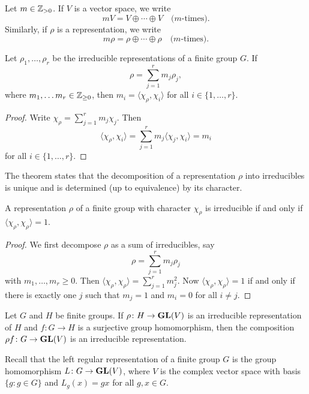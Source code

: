Let $m\in\mathbb{Z}_{>0}$. If $V$ is a vector space, we 
write \[
mV=V\oplus\cdots\oplus V\quad\text{($m$-times)}.
\]
Similarly,
if $\rho$ is a representation, 
we write 
\[
m\rho=\rho\oplus\cdots\oplus\rho\quad\text{($m$-times)}.
\]

\begin{theorem}
    Let $\rho_1,\dots,\rho_r$ be the irreducible representations of a finite group $G$. If 
	\[ 
    \rho=\sum_{j=1}^rm_j\rho_j,
    \]
    where $m_1,\dots m_r\in\mathbb{Z}_{\geq0}$, then
    $m_i=\langle \chi_\rho,\chi_i\rangle$ for all $i\in\{1,\dots,r\}$. 
\end{theorem}

\begin{proof}
    Write $\chi_\rho=\sum_{j=1}^rm_j\chi_j$. Then
    \[
    \langle\chi_\rho,\chi_i\rangle=\sum_{j=1}^rm_j\langle\chi_j,\chi_i\rangle=m_i
    \]
    for all $i\in\{1,\dots,r\}$.
\end{proof}

The theorem states that the decomposition of a representation $\rho$ into irreducibles 
is unique and is determined (up to equivalence) by its character.

\begin{corollary}
    A representation $\rho$ of a finite group with character $\chi_\rho$ is irreducible if and only if $\langle\chi_\rho,\chi_\rho\rangle=1$.
\end{corollary}

\begin{proof}
    We first decompose $\rho$ as a sum of irreducibles, say \[
    \rho=\sum_{j=1}^rm_j\rho_j
    \]
    with $m_1,\dots,m_r\geq0$. Then
    $\langle\chi_\rho,\chi_\rho\rangle=\sum_{j=1}^rm_j^2$. Now $\langle\chi_\rho,\chi_\rho\rangle=1$ if and only if
    there is exactly one $j$ such that $m_j=1$ and $m_i=0$ for all $i\ne j$.  
\end{proof}

\begin{exercise}
    Let $G$ and $H$ be finite groups. 
    If $\rho\colon H\to\mathbf{GL}(V)$ is an irreducible
    representation of $H$ and 
    $f\colon G\to H$ is a surjective group homomorphism, then the composition $\rho f\colon G\to\mathbf{GL}(V)$ is an irreducible representation. 
\end{exercise}

Recall that the left regular representation of a finite group $G$
is the group homomorphism $L\colon G\to \mathbf{GL}(V)$, where $V$ is the complex vector space
with basis $\{g:g\in G\}$ and $L_g(x)=gx$ for all $g,x\in G$. 

